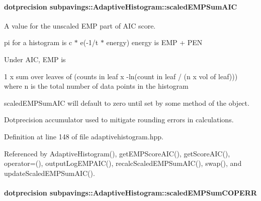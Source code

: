 \hypertarget{classsubpavings_1_1AdaptiveHistogram_ad5748390a25f398475bb60575f0e9a89}{
\paragraph[{scaled\-E\-M\-P\-Sum\-A\-I\-C}]{\setlength{\rightskip}{0pt plus 5cm}dotprecision {\bf subpavings\-::\-Adaptive\-Histogram\-::scaled\-E\-M\-P\-Sum\-A\-I\-C}}}\label{classsubpavings_1_1AdaptiveHistogram_ad5748390a25f398475bb60575f0e9a89}


\-A value for the unscaled \-E\-M\-P part of \-A\-I\-C score. 

pi for a histogram is c $\ast$ e(-\/1/t $\ast$ energy) energy is \-E\-M\-P + \-P\-E\-N

\-Under \-A\-I\-C, \-E\-M\-P is
\begin{DoxyItemize}
\item 1 x sum over leaves of (counts in leaf x -\/ln(count in leaf / (n x vol of leaf))) where n is the total number of data points in the histogram
\end{DoxyItemize}

scaled\-E\-M\-P\-Sum\-A\-I\-C will default to zero until set by some method of the object.

\-Dotprecision accumulator used to mitigate rounding errors in calculations. 

\-Definition at line 148 of file adaptivehistogram.\-hpp.



\-Referenced by \-Adaptive\-Histogram(), get\-E\-M\-P\-Score\-A\-I\-C(), get\-Score\-A\-I\-C(), operator=(), output\-Log\-E\-M\-P\-A\-I\-C(), recalc\-Scaled\-E\-M\-P\-Sum\-A\-I\-C(), swap(), and update\-Scaled\-E\-M\-P\-Sum\-A\-I\-C().

\hypertarget{classsubpavings_1_1AdaptiveHistogram_acd3c0bacd5148b82188cc129b3a59e96}{
\paragraph[{scaled\-E\-M\-P\-Sum\-C\-O\-P\-E\-R\-R}]{\setlength{\rightskip}{0pt plus 5cm}dotprecision {\bf subpavings\-::\-Adaptive\-Histogram\-::scaled\-E\-M\-P\-Sum\-C\-O\-P\-E\-R\-R}}}\label{classsubpavings_1_1AdaptiveHistogram_acd3c0bacd5148b82188cc129b3a59e96}


